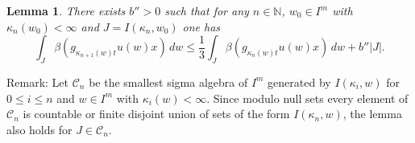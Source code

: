 \documentclass[12pt]{amsart}
\newtheorem{lem}[thm]{Lemma}
\theoremstyle{definition}
\theoremstyle{remark}
\numberwithin{equation}{section}
\begin{document}
\begin{lem}\label{lem;new eq}
There exists  $b''>0$ such that  for  any  $n\in \mathbb N$, $w_0\in I^m$ with $\kappa_n(w_0)<\infty$
 and $J=I(\kappa_n,w_0)$ one has 
\begin{equation}\label{eq;goalsingular}
\int_{J}\beta (g_{\kappa_{n+1}(w)t}u(w)x)\,dw\le \frac{1}{3} \int_{J}
\beta(g_{\kappa_n(w)t}u(w)x)\,dw +b''|J|.
\end{equation}
\end{lem}
Remark: Let $\mathcal C_n$ be the smallest sigma algebra of $I^m$ generated by   $I(\kappa_i, w)$  for
  $0\le i\le n$ and $w\in I^m$ with $\kappa_i(w)<\infty$.
Since modulo null sets every element  of $\mathcal C_n$ is  countable or finite disjoint  union of sets of the form $I(\kappa_n, w)$, the lemma
also holds for $J\in \mathcal C_n$.
\end{document}
